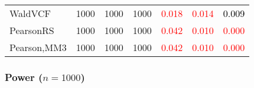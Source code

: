 \documentclass[
]{article}
\begin{document}
\begin{table}[H]
{\begin{tabular}[t]{lrrrrrr}
\hspace{1em}WaldVCF & 1000 & 1000 & 1000 & \textcolor{red}{0.018} & \textcolor{red}{0.014} & \textcolor{black}{0.009}\\
\hspace{1em}PearsonRS & 1000 & 1000 & 1000 & \textcolor{red}{0.042} & \textcolor{red}{0.010} & \textcolor{red}{0.000}\\
\hspace{1em}Pearson,MM3 & 1000 & 1000 & 1000 & \textcolor{red}{0.042} & \textcolor{red}{0.010} & \textcolor{red}{0.000}\\
\bottomrule
\end{tabular}}
\endgroup{}
\end{table}

\hypertarget{power-n1000-3}{%
\subsubsection{\texorpdfstring{Power
(\(n=1000\))}{Power (n=1000)}}\label{power-n1000-3}}
\end{document}
